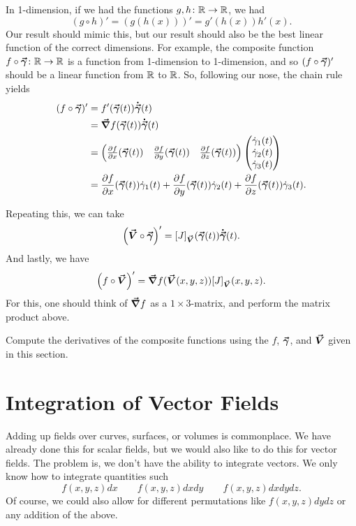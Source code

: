      	In 1-dimension, if we had the functions $g,h \colon \mathbb{R} \to \mathbb{R}$, we had
     	\[
     	(g\circ h)'=\left(g(h(x))\right)' = g'(h(x))h'(x).
     	\]
     	Our result should mimic this, but our result should also be the best linear function of the correct dimensions.  For example, the composite function $f\circ \boldsymbol{\vec{\gamma}} \colon \mathbb{R} \to \mathbb{R}$ is a function from 1-dimension to 1-dimension, and so $(f\circ \boldsymbol{\vec{\gamma}})'$ should be a linear function from $\mathbb{R}$ to $\mathbb{R}$. So, following our nose, the chain rule yields
     	\begin{align*}
     		(f\circ \boldsymbol{\vec{\gamma}})' &= f'(\boldsymbol{\vec{\gamma}}(t))\boldsymbol{\dot{\vec{\gamma}}}(t)\\
     		&= \boldsymbol{\vec{\nabla}} f(\boldsymbol{\vec{\gamma}}(t)) \boldsymbol{\dot{\vec{\gamma}}}(t)\\
     		&= \begin{pmatrix} \frac{\partial f}{\partial x}(\boldsymbol{\vec{\gamma}}(t)) &\frac{\partial f}{\partial y}(\boldsymbol{\vec{\gamma}}(t)) & \frac{\partial f}{\partial z}(\boldsymbol{\vec{\gamma}}(t)) \end{pmatrix} \begin{pmatrix} \dot{\gamma}_1(t) \\ \dot{\gamma}_2(t) \\ \dot{\gamma}_3(t) \end{pmatrix}\\
     		&= \frac{\partial f}{\partial x}(\boldsymbol{\vec{\gamma}}(t)) \dot{\gamma}_1(t) + \frac{\partial f}{\partial y}(\boldsymbol{\vec{\gamma}}(t)) \dot{\gamma}_2(t) +\frac{\partial f}{\partial z}(\boldsymbol{\vec{\gamma}}(t)) \dot{\gamma}_3(t) .
     \end{align*}

 	Repeating this, we can take
 	\begin{align*}
 		\left(\boldsymbol{\vec{V}} \circ \boldsymbol{\vec{\gamma}}\right)' = [J]_{\boldsymbol{\vec{V}}}(\boldsymbol{\vec{\gamma}}(t)) \boldsymbol{\dot{\vec{\gamma}}}(t).
 	\end{align*}
 	And lastly, we have
 	\[
 	\left(f \circ \boldsymbol{\vec{V}}\right)' = \boldsymbol{\vec{\nabla}} f(\boldsymbol{\vec{V}}(x,y,z)) [J]_{\boldsymbol{\vec{V}}}(x,y,z).
 	\]
 	For this, one should think of $\boldsymbol{\vec{\nabla}} f$ as a $1\times 3$-matrix, and perform the matrix product above.

 	\begin{exercise}
 		Compute the derivatives of the composite functions using the $f$, $\boldsymbol{\vec{\gamma}}$, and $\boldsymbol{\vec{V}}$ given in this section.
 	\end{exercise}



       \section{Integration of Vector Fields}
       Adding up fields over curves, surfaces, or volumes is commonplace. We have already done this for scalar fields, but we would also like to do this for vector fields. The problem is, we don't have the ability to integrate vectors.  We only know how to integrate quantities such
       \[
       f(x,y,z)dx \qquad f(x,y,z)dxdy \qquad f(x,y,z)dxdydz.
       \]
       Of course, we could also allow for different permutations like $f(x,y,z)dydz$ or any addition of the above.

